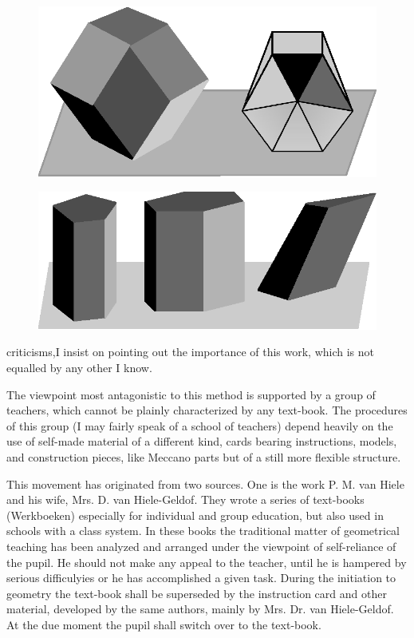 \begin{figure}[H]
\centering
\includegraphics[scale=.9]{figure/fig_16.eps}
\caption{}\label{chap6-fig16}
\end{figure}

\begin{figure}[H]
\centering
\includegraphics[scale=.9]{figure/fig_17.eps}
\caption{}\label{chap6-fig17}
\end{figure}

\setcounter{pageoriginal}{86}
\noindent
criticisms,\pageoriginale I insist on pointing out the importance of this work, which is not equalled by any other I know.

The viewpoint most antagonistic to this method is supported by a group of teachers, which cannot be plainly characterized by any text-book. The procedures of this group (I may fairly speak of a school of teachers) depend heavily on the use of self-made material of a different kind, cards bearing instructions, models, and construction pieces, like Meccano parts but of a still more flexible structure. 

This movement has originated from two sources. One is the work P. M. van Hiele and his wife, Mrs. D. van Hiele-Geldof. They wrote a series of text-books (Werkboeken) especially for individual and group education, but also used in schools with a class system. In these books the traditional matter of geometrical teaching has been analyzed and arranged under the viewpoint of self-reliance of the pupil. He should not make any appeal to the teacher, until he is hampered by serious difficulyies or he has accomplished a given task. During the initiation to geometry the text-book shall be superseded by the instruction card and other material, developed by the same authors, mainly by Mrs. Dr. van Hiele-Geldof. At the due moment the pupil shall switch over to the text-book.

